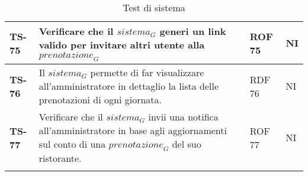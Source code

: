 \begin{longtable}{|>{\centering\arraybackslash}p{1.5cm}|p{12cm}|p{2cm}|p{1cm}|}
  \hline
  \rowcolor{gray!10}
  \textbf{TS-75} & Verificare che il $\textit{sistema}_G$ generi un link valido per invitare altri utente alla $\textit{prenotazione}_G$ & ROF 75 & NI \\
  \hline
  \rowcolor{gray!10}
  \textbf{TS-76} &  Il $\textit{sistema}_G$ permette di far visualizzare all’amministratore in dettaglio la lista
delle prenotazioni di ogni giornata. & RDF 76 & NI \\
  \hline
  \rowcolor{gray!10}
  \textbf{TS-77} & Verificare che il $\textit{sistema}_G$ invii una notifica all’amministratore in base agli aggiornamenti sul conto di una $\textit{prenotazione}_G$ del suo ristorante. & ROF 77 & NI \\
  \hline
  \caption{Test di sistema} 
  \label{tab:test_sistema}
  \end{longtable}
    
